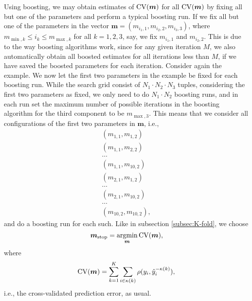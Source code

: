 Using boosting, we may obtain estimates of $\operatorname{CV}(\boldsymbol{m})$ for all $\operatorname{CV}(\boldsymbol{m})$ by fixing all but one of the parameters and perform a typical boosting run.
If we fix all but one of the parameters in the vector $\boldsymbol{m}=\left(m_{i_1,1},m_{i_2,2},m_{i_3,3}\right)$, where $m_{\min,k}\leq i_k\leq m_{\max,k}$ for all $k=1,2,3$, say, we fix $m_{i_1,1}$ and $m_{i_2,2}$.
This is due to the way boosting algorithms work, since for any given iteration $M$, we also automatically obtain all boosted estimates for all iterations less than $M$, if we have saved the boosted parameters for each iteration.
Consider again the example.
We now let the first two parameters in the example be fixed for each boosting run.
While the search grid consist of $N_1\cdot N_2\cdot N_3$ tuples, considering the first two parameters as fixed, we only need to do $N_1\cdot N_2$ boosting runs, and in each run set the maximum number of possible iterations in the boosting algorithm for the third component to be $m_{\max,3}$.
This means that we consider all configurations of the first two parameters in $\boldsymbol{m}$, i.e.,
\begin{align*}
    \left(m_{1,1},m_{1,2}\right) \\
    \left(m_{1,1},m_{2,2}\right) \\
    \ldots \\
    \left(m_{1,1},m_{10,2}\right) \\
    \left(m_{2,1},m_{1,2}\right) \\
    \ldots \\
    \left(m_{2,1},m_{10,2}\right) \\
    \ldots \\
    \left(m_{10,2},m_{10,2}\right),
\end{align*}
and do a boosting run for each such.
Like in subsection \ref{subsec:K-fold}, we choose
\begin{equation*}
    \boldsymbol{m}_{\text{stop}}=\operatorname*{argmin}_{\boldsymbol{m}}\operatorname{CV}(\boldsymbol{m}),
\end{equation*}
where
\begin{equation*}
    \operatorname{CV}(\boldsymbol{m})=\sum_{k=1}^K\sum_{i\in\kappa(k)}\rho(y_i,\hat{y}_i^{-\kappa(k)}),
\end{equation*}
i.e., the cross-validated prediction error, as usual.
